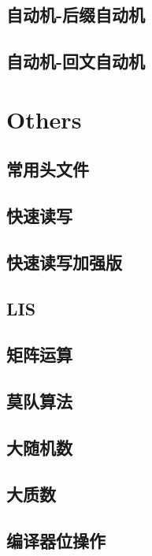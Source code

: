 \documentclass[UTF8]{ctexart}
\begin{document}
\begin{CJK}{UTF8}{<font>}
\begin{spacing}{0.80}
\subsection{自动机-后缀自动机} 
\subsection{自动机-回文自动机} 
\section{Others}
\subsection{常用头文件} 
\subsection{快速读写} 
\subsection{快速读写加强版} 
\subsection{LIS} 
\subsection{矩阵运算} 
\subsection{莫队算法} 
\subsection{大随机数} 
\subsection{大质数} 
\subsection{编译器位操作} 

\end{spacing}
\end{CJK}
\end{document}
